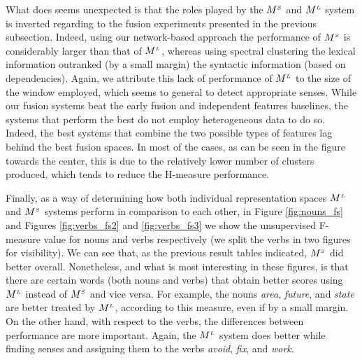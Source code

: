 What does seems unexpected is that the roles played by the $M^{\scriptscriptstyle S}$ and $M^{\scriptscriptstyle L}$ system is inverted regarding to the fusion experiments presented in the previous subsection. Indeed, using our network-based approach the performance of $M^{\scriptscriptstyle S}$ is considerably larger than that of $M^{\scriptscriptstyle L}$, whereas using spectral clustering the lexical information outranked (by a small margin) the syntactic information (based on dependencies). Again, we attribute this lack of performance of $M^{\scriptscriptstyle L}$ to the size of the window employed, which seems to general to detect appropriate senses. While our fusion systems beat the early fusion and independent features baselines, the systems that perform the best do not employ heterogeneous data to do so. Indeed, the best systems that combine the two possible types of features lag behind the best fusion spaces. In most of the cases, as can be seen in the figure towards the center, this is due to the relatively lower number of clusters produced, which tends to reduce the H-measure performance.


 
Finally, as a way of determining how both individual representation spaces $M^{\scriptscriptstyle L}$ and $M^{\scriptscriptstyle S}$ systems perform in comparison to each other, in Figure \ref{fig:nouns_fs} and Figures  \ref{fig:verbs_fs2} and \ref{fig:verbs_fs3} we show the unsupervised F-measure value for nouns and verbs respectively (we split the verbs in two figures for visibility). We can see that, as the previous result tables indicated, $M^{\scriptscriptstyle S}$ did better overall. Nonetheless, and what is most interesting in these figures, is that there are certain words (both nouns and verbs) that obtain better scores using $M^{\scriptscriptstyle L}$ instead of $M^{\scriptscriptstyle S}$ and vice versa. For example, the nouns \textit{area}, \textit{future}, and \textit{state} are better treated by $M^{\scriptscriptstyle L}$, according to this measure, even if by a small margin. On the other hand, with respect to the verbs, the differences between performance are more important. Again, the $M^{\scriptscriptstyle L}$ system does better while finding senses and assigning them to the verbs \textit{avoid}, \textit{fix}, and \textit{work}. %

 




